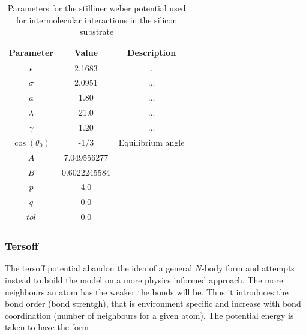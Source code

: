\begin{table}[H]
  \begin{center}
  \caption{Parameters for the stilliner weber potential used for intermolecular interactions in the silicon substrate}
  \label{tab:param}
  \begin{tabular}{ | c | c | c|} \hline
    Parameter & Value & Description \\ \hline 
    $\epsilon$ & 2.1683  & ... \\ \hline
    $\sigma$ & 2.0951 & ... \\ \hline
    $a$ & 1.80 & ... \\ \hline
    $\lambda$ & 21.0 & ... \\ \hline
    $\gamma$ & 1.20 & ... \\ \hline
    $\cos{(\theta_0)}$ & -1/3 & Equilibrium angle \\ \hline
    $A$ &  7.049556277 & \\ \hline
    $B$ &  0.6022245584 &  \\ \hline
    $p$  & 4.0 & \\ \hline
    $q$  & 0.0 & \\ \hline
    $tol$  & 0.0 & \\ \hline
  \end{tabular}
  \end{center}
\end{table}




\subsubsection{Tersoff}



The tersoff potential abandon the idea of a general $N$-body form and attempts instead to build the model on a more physics informed approach. The more neighbours an atom has the weaker the bonds will be. Thus it introduces the bond order (bond strentgh), that is environment specific and increase with bond coordination (number of neighbours for a given atom). The potential energy is taken to have the form

